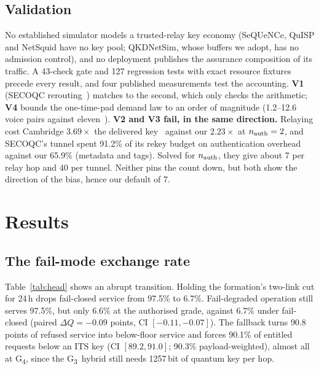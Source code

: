 \documentclass[conference,a4paper]{IEEEtran}
\newcommand{\GIII}{G\textsubscript{3}}
\newcommand{\GIV}{G\textsubscript{4}}
\begin{document}
\subsection{Validation}\label{sec:valid}
No established simulator models a trusted-relay key economy (SeQUeNCe, QuISP and
NetSquid have no key pool; QKDNetSim, whose buffers we adopt, has no admission
control), and no deployment publishes the assurance composition of its traffic. A
43-check gate and 127 regression tests with exact resource fixtures precede every
result, and four published measurements test the accounting. \textbf{V1} (SECOQC
rerouting~\cite{peev}) matches to the second, which only checks the arithmetic; \textbf{V4} bounds the one-time-pad demand law to an order of
magnitude (1.2--12.6 voice pairs against eleven~\cite{chen}). \textbf{V2 and V3 fail,
in the same direction.} Relaying cost Cambridge $3.69\times$ the delivered
key~\cite{dynes} against our $2.23\times$ at $n_{\rm auth}=2$, and SECOQC's tunnel
spent 91.2\% of its rekey budget on authentication overhead against our 65.9\%
(metadata and tags). Solved for $n_{\rm auth}$, they give about 7 per relay hop and 40
per tunnel. Neither pins the count down, but both show the direction of the bias,
hence our default of 7.

\section{Results}
\subsection{The fail-mode exchange rate}\label{sec:head}
\begin{table}[t]
\caption{Formation under a 24\,h generation attack ($\Delta e=0.05$) from 2\% usable
fill, twelve seeds. $b$: budget in relative cost; cut: cut links first ($b=2$ is the cut); betw.: static-betweenness adversary. $A$, $Q$,
class $Q$: \% of arrivals; $F$: \% of entitled arrivals; \GIV: \% of served sessions.
95\% bootstrap half-widths ${\le}1.0$ point and seed SDs ${\le}1.8$, except
$Q_{\mathrm{ISR}}$ (3.1 and 5.6; ${\approx}175$ ISR arrivals per seed).}
\label{tab:head}
\centering\footnotesize
\setlength{\tabcolsep}{2.2pt}

\end{table}

Table~\ref{tab:head} shows an abrupt transition. Holding the formation's two-link cut
for 24\,h drops fail-closed service from 97.5\% to 6.7\%. Fail-degraded operation
still serves 97.5\%, but only 6.6\% at the authorised grade, against 6.7\% under
fail-closed (paired $\Delta Q=-0.09$ points, CI $[-0.11,-0.07]$). The fallback turns
90.8 points of refused service into below-floor service and forces 90.1\% of entitled
requests below an ITS key (CI $[89.2,91.0]$; 90.3\% payload-weighted), almost all at
\GIV, since the \GIII\ hybrid still needs 1257\,bit of quantum key per hop.
\end{document}
